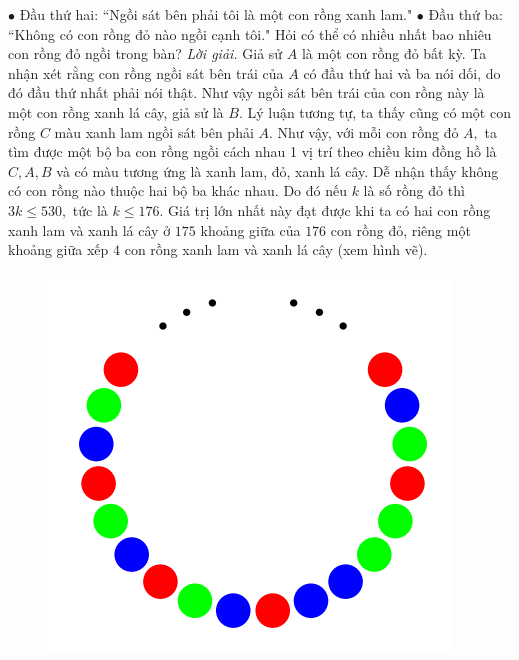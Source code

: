 \begin{multicols}{2}
	$\bullet$ Đầu thứ hai: ``Ngồi sát bên phải tôi là một con rồng xanh lam."
	\vskip 0.1cm
	$\bullet$ Đầu thứ ba: ``Không có con rồng đỏ nào ngồi cạnh tôi."
	\vskip 0.1cm
	Hỏi có thể có nhiều nhất bao nhiêu con rồng đỏ ngồi trong bàn?
	\vskip 0.1cm
	\textit{Lời giải.} Giả sử $A$ là một con rồng đỏ bất kỳ. Ta nhận xét rằng con rồng ngồi sát bên trái của $A$ có đầu thứ hai và ba nói dối, do đó đầu thứ nhất phải nói thật. Như vậy ngồi sát bên trái của con rồng này là một con rồng xanh lá cây, giả sử là $B.$ Lý luận tương tự, ta thấy cũng có một con rồng $C$ màu xanh lam ngồi sát bên phải $A$.
	\vskip 0.1cm
	Như vậy, với mỗi con rồng đỏ $A,$ ta tìm được một bộ ba con rồng ngồi cách nhau 1 vị trí theo chiều kim đồng hồ là $C, A, B$ và có màu tương ứng là xanh lam, đỏ, xanh lá cây. Dễ nhận thấy không có con rồng nào thuộc hai bộ ba khác nhau. Do đó nếu $k$ là số rồng đỏ thì $3k\le 530,$ tức là $k\le 176.$
	\vskip 0.1cm
	Giá trị lớn nhất này đạt được khi ta có hai con rồng xanh lam và xanh lá cây ở $175$ khoảng giữa của $176$ con rồng đỏ, riêng một khoảng giữa xếp $4$ con rồng xanh lam và xanh lá cây (xem hình vẽ).
	\begin{figure}[H]
		\vspace*{-5pt}
		\centering
		\captionsetup{labelformat= empty, justification=centering}
		\includegraphics[width= 1\linewidth]{OC10}
		\vspace*{-15pt}
	\end{figure}

\end{multicols}
